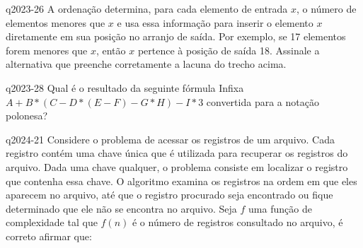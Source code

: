 \documentclass[10pt,a4paper]{article}
\begin{document}
{
\def\AMCbeginQuestion#1#2{\par\noindent{\bf (POSCOMP 2023 - Questão 26)}}
\begin{question}{q2023-26} A ordenação \underline{\hspace{3cm}} determina, para cada elemento de entrada $x$, o número de elementos menores que $x$ e usa essa informação para inserir o elemento $x$ diretamente em sua posição no arranjo de saída. Por exemplo, se 17 elementos forem menores que $x$, então $x$ pertence à posição de saída 18. Assinale a alternativa que preenche corretamente a lacuna do trecho acima.
\begin{choices}
\end{choices}
\end{question}
}

{
\def\AMCbeginQuestion#1#2{\par\noindent{\bf (POSCOMP 2023 - Questão 28)}}
\begin{question}{q2023-28} Qual é o resultado da seguinte fórmula Infixa $A+B*(C-D*(E-F)-G*H)-I*3$ convertida para a notação polonesa?
\begin{choices}
\end{choices}
\end{question}
}

{
\def\AMCbeginQuestion#1#2{\par\noindent{\bf (POSCOMP 2024 - Questão 21)}}
\begin{question}{q2024-21} Considere o problema de acessar os registros de um arquivo. Cada registro contém uma chave única que é utilizada para recuperar os registros do arquivo. Dada uma chave qualquer, o problema consiste em localizar o registro que contenha essa chave. O algoritmo examina os registros na ordem em que eles aparecem no arquivo, até que o registro procurado seja encontrado ou fique determinado que ele não se encontra no arquivo. Seja $f$ uma função de complexidade tal que $f(n)$ é o número de registros consultado no arquivo, é correto afirmar que:
\begin{choices}
\end{choices}
\end{question}
}
\end{document}

